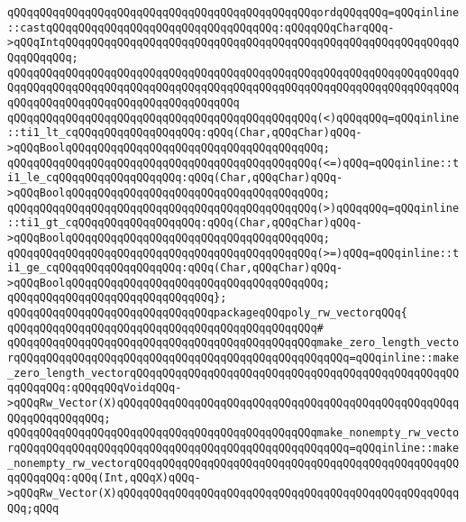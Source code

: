 \newline
\verb|qQQqqQQqqQQqqQQqqQQqqQQqqQQqqQQqqQQqqQQqqQQqqQQqordqQQqqQQq=qQQqinline::castqQQqqQQqqQQqqQQqqQQqqQQqqQQqqQQqqQQq:qQQqqQQqCharqQQq->qQQqIntqQQqqQQqqQQqqQQqqQQqqQQqqQQqqQQqqQQqqQQqqQQqqQQqqQQqqQQqqQQqqQQqqQQqqQQq;|\newline
\verb|qQQqqQQqqQQqqQQqqQQqqQQqqQQqqQQqqQQqqQQqqQQqqQQqqQQqqQQqqQQqqQQqqQQqqQQqqQQqqQQqqQQqqQQqqQQqqQQqqQQqqQQqqQQqqQQqqQQqqQQqqQQqqQQqqQQqqQQqqQQqqQQqqQQqqQQqqQQqqQQqqQQqqQQqqQQqqQQq|\newline
\verb|qQQqqQQqqQQqqQQqqQQqqQQqqQQqqQQqqQQqqQQqqQQqqQQq(<)qQQqqQQq=qQQqinline::ti1_lt_cqQQqqQQqqQQqqQQqqQQq:qQQq(Char,qQQqChar)qQQq->qQQqBoolqQQqqQQqqQQqqQQqqQQqqQQqqQQqqQQqqQQqqQQq;|\newline
\verb|qQQqqQQqqQQqqQQqqQQqqQQqqQQqqQQqqQQqqQQqqQQqqQQq(<=)qQQq=qQQqinline::ti1_le_cqQQqqQQqqQQqqQQqqQQq:qQQq(Char,qQQqChar)qQQq->qQQqBoolqQQqqQQqqQQqqQQqqQQqqQQqqQQqqQQqqQQqqQQq;|\newline
\verb|qQQqqQQqqQQqqQQqqQQqqQQqqQQqqQQqqQQqqQQqqQQqqQQq(>)qQQqqQQq=qQQqinline::ti1_gt_cqQQqqQQqqQQqqQQqqQQq:qQQq(Char,qQQqChar)qQQq->qQQqBoolqQQqqQQqqQQqqQQqqQQqqQQqqQQqqQQqqQQqqQQq;|\newline
\verb|qQQqqQQqqQQqqQQqqQQqqQQqqQQqqQQqqQQqqQQqqQQqqQQq(>=)qQQq=qQQqinline::ti1_ge_cqQQqqQQqqQQqqQQqqQQq:qQQq(Char,qQQqChar)qQQq->qQQqBoolqQQqqQQqqQQqqQQqqQQqqQQqqQQqqQQqqQQqqQQq;|\newline
\verb|qQQqqQQqqQQqqQQqqQQqqQQqqQQqqQQq};|\newline
\newline
\newline
\newline
\verb|qQQqqQQqqQQqqQQqqQQqqQQqqQQqqQQqpackageqQQqpoly_rw_vectorqQQq{|\newline
\verb|qQQqqQQqqQQqqQQqqQQqqQQqqQQqqQQqqQQqqQQqqQQqqQQq#|\newline
\verb|qQQqqQQqqQQqqQQqqQQqqQQqqQQqqQQqqQQqqQQqqQQqqQQqmake_zero_length_vectorqQQqqQQqqQQqqQQqqQQqqQQqqQQqqQQqqQQqqQQqqQQqqQQqqQQq=qQQqinline::make_zero_length_vectorqQQqqQQqqQQqqQQqqQQqqQQqqQQqqQQqqQQqqQQqqQQqqQQqqQQqqQQqqQQq:qQQqqQQqVoidqQQq->qQQqRw_Vector(X)qQQqqQQqqQQqqQQqqQQqqQQqqQQqqQQqqQQqqQQqqQQqqQQqqQQqqQQqqQQqqQQqqQQq;|\newline
\verb|qQQqqQQqqQQqqQQqqQQqqQQqqQQqqQQqqQQqqQQqqQQqqQQqmake_nonempty_rw_vectorqQQqqQQqqQQqqQQqqQQqqQQqqQQqqQQqqQQqqQQqqQQqqQQqqQQq=qQQqinline::make_nonempty_rw_vectorqQQqqQQqqQQqqQQqqQQqqQQqqQQqqQQqqQQqqQQqqQQqqQQqqQQqqQQqqQQq:qQQq(Int,qQQqX)qQQq->qQQqRw_Vector(X)qQQqqQQqqQQqqQQqqQQqqQQqqQQqqQQqqQQqqQQqqQQqqQQqqQQqqQQq;qQQq|\newline

